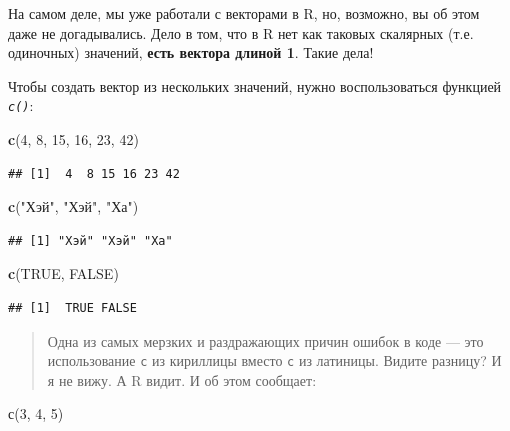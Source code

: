 \documentclass[]{book}
\newenvironment{Shaded}{\begin{snugshade}}{\end{snugshade}}
\newcommand{\KeywordTok}[1]{\textcolor[rgb]{0.13,0.29,0.53}{\textbf{#1}}}
\newcommand{\DecValTok}[1]{\textcolor[rgb]{0.00,0.00,0.81}{#1}}
\newcommand{\StringTok}[1]{\textcolor[rgb]{0.31,0.60,0.02}{#1}}
\newcommand{\OtherTok}[1]{\textcolor[rgb]{0.56,0.35,0.01}{#1}}
\newcommand{\NormalTok}[1]{#1}
\begin{document}
На самом деле, мы уже работали с векторами в R, но, возможно, вы об этом
даже не догадывались. Дело в том, что в R нет как таковых скалярных
(т.е. одиночных) значений, \textbf{есть вектора длиной 1}. Такие дела!

Чтобы создать вектор из нескольких значений, нужно воспользоваться
функцией \emph{\texttt{c()}}:

\begin{Shaded}
\begin{Highlighting}[]
\KeywordTok{c}\NormalTok{(}\DecValTok{4}\NormalTok{, }\DecValTok{8}\NormalTok{, }\DecValTok{15}\NormalTok{, }\DecValTok{16}\NormalTok{, }\DecValTok{23}\NormalTok{, }\DecValTok{42}\NormalTok{)}
\end{Highlighting}
\end{Shaded}

\begin{verbatim}
## [1]  4  8 15 16 23 42
\end{verbatim}

\begin{Shaded}
\begin{Highlighting}[]
\KeywordTok{c}\NormalTok{(}\StringTok{"Хэй"}\NormalTok{, }\StringTok{"Хэй"}\NormalTok{, }\StringTok{"Ха"}\NormalTok{)}
\end{Highlighting}
\end{Shaded}

\begin{verbatim}
## [1] "Хэй" "Хэй" "Ха"
\end{verbatim}

\begin{Shaded}
\begin{Highlighting}[]
\KeywordTok{c}\NormalTok{(}\OtherTok{TRUE}\NormalTok{, }\OtherTok{FALSE}\NormalTok{)}
\end{Highlighting}
\end{Shaded}

\begin{verbatim}
## [1]  TRUE FALSE
\end{verbatim}

\begin{quote}
Одна из самых мерзких и раздражающих причин ошибок в коде --- это
использование \texttt{с} из кириллицы вместо \texttt{c} из латиницы.
Видите разницу? И я не вижу. А R видит. И об этом сообщает:
\end{quote}

\begin{Shaded}
\begin{Highlighting}[]
\NormalTok{с(}\DecValTok{3}\NormalTok{, }\DecValTok{4}\NormalTok{, }\DecValTok{5}\NormalTok{)}
\end{Highlighting}
\end{Shaded}
\end{document}
